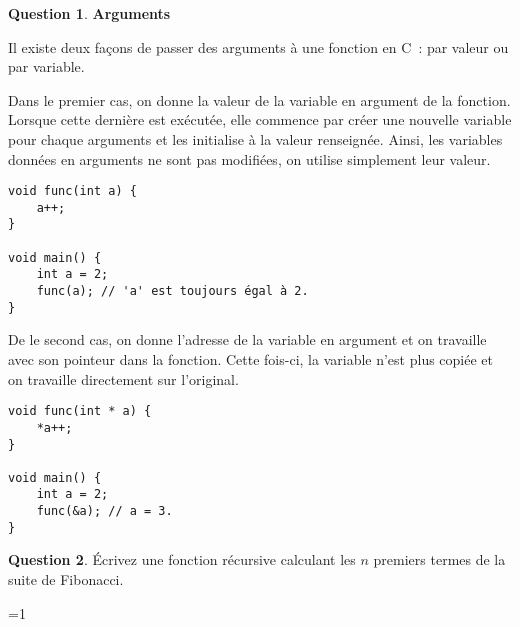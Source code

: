 \documentclass[11pt,a4paper,dvipsnames]{article}
\theoremstyle{definition}%
\newtheorem{Q}{Question}[] %
\newcounter{reponseCnt}
\begin{document}
\begin{Q} \textbf{Arguments}

Il existe deux façons de passer des arguments à une fonction en C~: par valeur ou par variable.

Dans le premier cas, on donne la valeur de la variable en argument de la fonction.
Lorsque cette dernière est exécutée, elle commence par créer une nouvelle variable pour chaque arguments et les initialise à la valeur renseignée.
Ainsi, les variables données en arguments ne sont pas modifiées, on utilise simplement leur valeur.
\begin{verbatim}
void func(int a) {
	a++;
}

void main() {
	int a = 2;
	func(a); // 'a' est toujours égal à 2.
}
\end{verbatim}

De le second cas, on donne l'adresse de la variable en argument et on travaille avec son pointeur dans la fonction.
Cette fois-ci, la variable n'est plus copiée et on travaille directement sur l'original.
\begin{verbatim}
void func(int * a) {
	*a++;
}

void main() {
	int a = 2;
	func(&a); // a = 3.
}
\end{verbatim}


\end{Q}



\begin{Q}
Écrivez une fonction récursive calculant les $n$ premiers termes de la suite de Fibonacci.

\ifnum\value{reponseCnt}=1
  
\fi
\end{Q}
\end{document}
